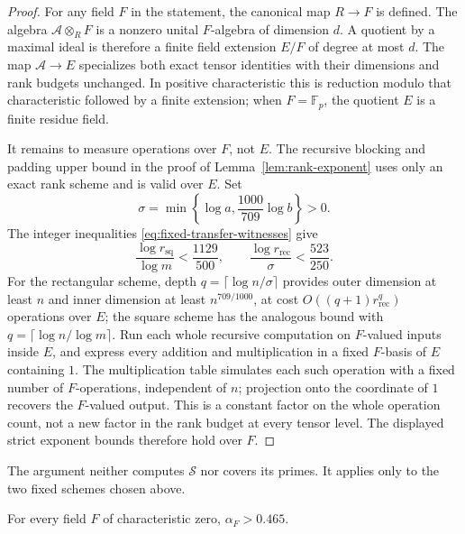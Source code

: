 \begin{proof}
For any field \(F\) in the statement, the canonical map \(R\to F\)
is defined.  The algebra \(\mathcal A\otimes_R F\) is a nonzero
unital \(F\)-algebra of dimension \(d\).  A quotient by a maximal
ideal is therefore a finite field extension \(E/F\) of degree at
most \(d\).  The map \(\mathcal A\to E\) specializes both exact
tensor identities with their dimensions and rank budgets unchanged.
In positive characteristic this is reduction modulo that
characteristic followed by a finite extension; when \(F=\mathbb F_p\),
the quotient \(E\) is a finite residue field.

It remains to measure operations over \(F\), not \(E\).  The recursive
blocking and padding upper bound in the proof of
Lemma~\ref{lem:rank-exponent} uses only an exact rank scheme and is valid
over \(E\).  Set
\[
 \sigma=\min\left\{\log a,\frac{1000}{709}\log b\right\}>0.
\]
The integer inequalities \eqref{eq:fixed-transfer-witnesses} give
\[
 \frac{\log r_{\mathrm{sq}}}{\log m}<\frac{1129}{500},\qquad
 \frac{\log r_{\mathrm{rec}}}{\sigma}<\frac{523}{250}.
\]
For the rectangular scheme, depth \(q=\lceil\log n/\sigma\rceil\)
provides outer dimension at least \(n\) and inner dimension at least
\(n^{709/1000}\), at cost \(O((q+1)r_{\mathrm{rec}}^q)\) operations
over \(E\); the square scheme has the analogous bound with
\(q=\lceil\log n/\log m\rceil\).
Run each whole recursive computation on \(F\)-valued inputs inside
\(E\), and express every addition and multiplication in a fixed
\(F\)-basis of \(E\) containing \(1\).  The multiplication table
simulates each such operation with a fixed number of \(F\)-operations,
independent of \(n\); projection onto the coordinate of \(1\) recovers
the \(F\)-valued output.  This is a constant factor on the whole
operation count, not a new factor in the rank budget at every tensor
level.  The displayed strict exponent bounds therefore hold over \(F\).
\end{proof}

The argument neither computes \(\mathcal S\) nor covers its primes.
It applies only to the two fixed schemes chosen above.

\begin{corollary}\label{cor:characteristic-zero-dual}
For every field \(F\) of characteristic zero, \(\alpha_F>0.465\).
\end{corollary}

